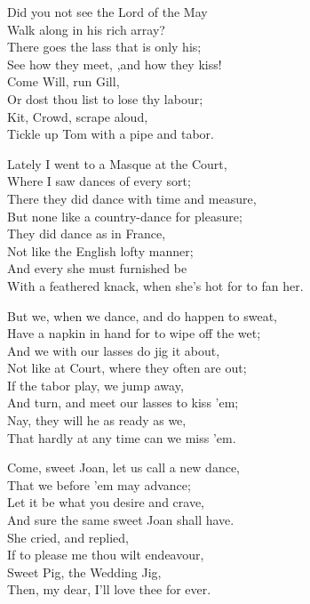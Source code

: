 \begin{dcverse}\footnotesizerr
\begin{patverse}
Did you not see the Lord of the May\\
Walk along in his rich array?\\
There goes the lass that is only his;\\
See how they meet, ,and how they kiss!\\
Come Will, run Gill,\\
Or dost thou list to lose thy labour;\\
Kit, Crowd, scrape aloud,\\
Tickle up Tom with a pipe and tabor.
\end{patverse}

\begin{patverse}
Lately I went to a Masque at the Court,\\
Where I saw dances of every sort;\\
There they did dance with time and measure,\\
But none like a country-dance for pleasure;\\
They did dance as in France,\\
Not like the English lofty manner;\\
And every she must furnished be\\
With a feathered knack, when she’s hot for to fan her.
\end{patverse}

\begin{patverse}
But we, when we dance, and do happen to sweat,\\
Have a napkin in hand for to wipe off the wet;\\
And we with our lasses do jig it about,\\
Not like at Court, where they often are out;\\
If the tabor play, we jump away,\\
And turn, and meet our lasses to kiss 'em;\\
Nay, they will he as ready as we,\\
That hardly at any time can we miss 'em.
\end{patverse}
\columnbreak

\begin{patverse}
Come, sweet Joan, let us call a new dance,\\
That we before ’em may advance;\\
Let it be what you desire and crave,\\
And sure the same sweet Joan shall have.\\
She cried, and replied,\\
If to please me thou wilt endeavour,\\
Sweet Pig, the Wedding Jig,\\
Then, my dear, I’ll love thee for ever.
\end{patverse}


\end{dcverse}
